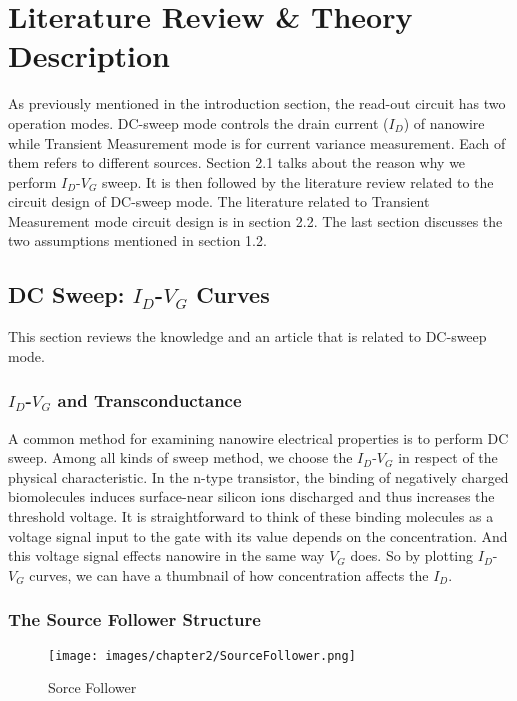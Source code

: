 \chapter{Literature Review \& Theory Description}
As previously mentioned in the introduction section, the read-out circuit has two operation modes.
DC-sweep mode controls the drain current ($I_D$) of nanowire while Transient Measurement mode is for current variance measurement.
Each of them refers to different sources.
Section 2.1 talks about the reason why we perform $I_D$-$V_G$ sweep.
It is then followed by the literature review related to the circuit design of DC-sweep mode.
The literature related to Transient Measurement mode circuit design is in section 2.2.
The last section discusses the two assumptions mentioned in section 1.2.

\section{DC Sweep: $I_D$-$V_G$ Curves}
This section reviews the knowledge and an article that is related to DC-sweep mode.

\subsection{$I_D$-$V_G$ and Transconductance}
A common method for examining nanowire electrical properties is to perform DC sweep.
Among all kinds of sweep method, we choose the $I_D$-$V_G$ in respect of the physical characteristic.
In the n-type transistor, the binding of negatively charged biomolecules induces surface-near silicon ions discharged and thus increases the threshold voltage.
It is straightforward to think of these binding molecules as a voltage signal input to the gate with its value depends on the concentration.
And this voltage signal effects nanowire in the same way $V_G$ does.
So by plotting $I_D$-$V_G$ curves, we can have a thumbnail of how concentration affects the $I_D$.

\subsection{The Source Follower Structure} \label{section:SF}

\begin{figure}[h]
    \centering
    \texttt{[image: images/chapter2/SourceFollower.png]}
    \fontsize{6}{7}\selectfont
    \caption{Sorce Follower}
    \label{fig:SF}
\end{figure}

